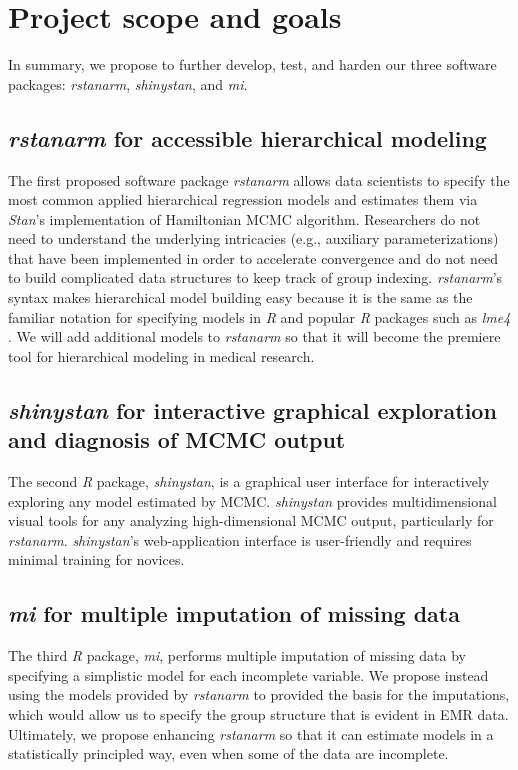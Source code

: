 \documentclass[11pt,notitlepage]{article}
\begin{document}
\section*{Project scope and goals}

In summary, we propose to further develop, test, and harden our three software packages: \textit{rstanarm}, \textit{shinystan}, and \textit{mi}.

\subsection*{\textit{rstanarm} for accessible hierarchical modeling}
The first proposed software package \textit{rstanarm} allows data scientists to specify the most common applied hierarchical regression models 
and estimates them via \textit{Stan}'s implementation of Hamiltonian MCMC algorithm. Researchers do not
need to understand the underlying intricacies (e.g., auxiliary parameterizations) that have been implemented in order to accelerate convergence and 
do not need to build complicated data structures to keep track of group indexing. \textit{rstanarm}'s syntax makes hierarchical model building easy
because it is the same as the familiar notation for specifying models in \textit{R} and popular \textit{R} packages such as \textit{lme4} \cite{lme4}.
We will add additional models to \textit{rstanarm} so that it will become the premiere tool for hierarchical modeling in medical research.

\subsection*{\textit{shinystan} for interactive graphical exploration and diagnosis of MCMC output}  
The second \textit{R} package, \textit{shinystan}, is a graphical user interface for interactively exploring any model estimated by MCMC. 
\textit{shinystan} provides multidimensional visual tools for any analyzing high-dimensional MCMC output, particularly for 
\textit{rstanarm}. \textit{shinystan}'s web-application interface is user-friendly and requires minimal training for novices.

\subsection*{\textit{mi} for multiple imputation of missing data}
The third \textit{R} package, \textit{mi}, performs multiple imputation of missing data by specifying a simplistic model 
for each incomplete variable. We propose instead using the models provided by \textit{rstanarm} to provided the basis for
the imputations, which would allow us to specify the group structure that is evident in EMR data. Ultimately, we 
propose enhancing \textit{rstanarm} so that it can estimate models in a statistically principled way, even when some of
the data are incomplete.
\end{document}
